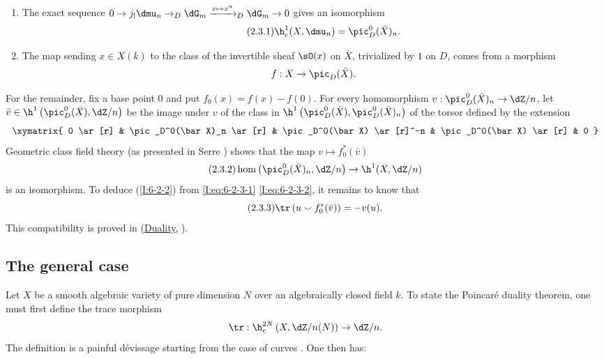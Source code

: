 \begin{enumerate}[\indent a)]
  \item {}The exact sequence
    $0\to j_!\dmu_n\to_D\dG_m\xrightarrow{x\mapsto x^n}_D\dG_m\to0$ gives an
    isomorphism
    \begin{equation*}\tag{2.3.1}\label{I:eq:6-2-3-1}
      \h_c^1(X,\dmu_n) = \pic_D^0(\bar X)_n \text{.}
    \end{equation*}
  \item The map sending $x\in X(k)$ to the class of the invertible sheaf
    $\sO(x)$ on $\bar X$, trivialized by $1$ on $D$, comes from a
    morphism
    \[
      f:X \to \pic_D(\bar X) \text{.}
    \]
\end{enumerate}
For the remainder, fix a base point $0$ and put
$f_0(x)=f(x)-f(0)$. For every homomorphism
$v:\pic_D^0(\bar X)_n\to\dZ/n$, let
$\bar v\in\h^1\left(\pic_D^0(\bar X),\dZ/n\right)$ be the image under
$v$ of the class in
$\h^1\left(\pic_D^0(\bar X),\pic_D^0(\bar X)_n\right)$ of the torsor
defined by the extension
\[\xymatrix{
  0 \ar[r]
    & \pic_D^0(\bar X)_n \ar[r]
    & \pic_D^0(\bar X) \ar[r]^-n
    & \pic_D^0(\bar X) \ar[r]
    & 0
}\]
Geometric class field theory (as presented in Serre ) shows
that the map $v\mapsto f_0^*(\bar v)$
\begin{equation*}\tag{2.3.2}\label{I:eq:6-2-3-2}
  \hom\left(\pic_D^0(\bar X)_n,\dZ/n\right) \to \h^1(X,\dZ/n)
\end{equation*}
is an isomorphism. To deduce (\ref{I:6-2-2}) from
\eqref{I:eq:6-2-3-1} \eqref{I:eq:6-2-3-2}, it remains to know that
\begin{equation*}\tag{2.3.3}\label{I:eq:6-2-3-3}
  \tr\left(u \smallsmile f_0^*(\bar v)\right) = -v(u) \text{.} \end{equation*}
This compatibility is proved in (\hyperref[V]{Duality}, ).


\subsection{The general case}\label{I:6-3}

Let $X$ be a smooth algebraic variety of pure dimension $N$ over an
algebraically closed field $k$. To state the Poincaré duality theorem,
one must first define the trace morphism
\[
  \tr : \h_c^{2N}\left(X,\dZ/n(N)\right) \to \dZ/n\text{.}
\]
The definition is a painful dévissage starting from the case of curves
. One then has:


